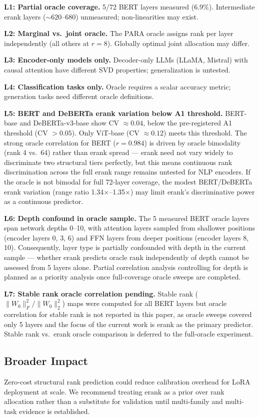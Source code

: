 \textbf{L1: Partial oracle coverage.} 5/72 BERT layers measured (6.9\%). Intermediate erank layers ($\sim 620$--$680$) unmeasured; non-linearities may exist.

\textbf{L2: Marginal vs.\ joint oracle.} The PARA oracle assigns rank per layer independently (all others at $r=8$). Globally optimal joint allocation may differ.

\textbf{L3: Encoder-only models only.} Decoder-only LLMs (LLaMA, Mistral) with causal attention have different SVD properties; generalization is untested.

\textbf{L4: Classification tasks only.} Oracle requires a scalar accuracy metric; generation tasks need different oracle definitions.

\textbf{L5: BERT and DeBERTa erank variation below A1 threshold.} BERT-base and DeBERTa-v3-base show CV $\approx 0.04$, below the pre-registered A1 threshold (CV $> 0.05$). Only ViT-base (CV $\approx 0.12$) meets this threshold. The strong oracle correlation for BERT ($r = 0.984$) is driven by oracle bimodality (rank 4 vs.\ 64) rather than erank spread --- erank need not vary widely to discriminate two structural tiers perfectly, but this means continuous rank discrimination across the full erank range remains untested for NLP encoders. If the oracle is not bimodal for full 72-layer coverage, the modest BERT/DeBERTa erank variation (range ratio 1.34$\times$--1.35$\times$) may limit erank's discriminative power as a continuous predictor.

\textbf{L6: Depth confound in oracle sample.} The 5 measured BERT oracle layers span network depths 0--10, with attention layers sampled from shallower positions (encoder layers 0, 3, 6) and FFN layers from deeper positions (encoder layers 8, 10). Consequently, layer type is partially confounded with depth in the current sample --- whether erank predicts oracle rank independently of depth cannot be assessed from 5 layers alone. Partial correlation analysis controlling for depth is planned as a priority analysis once full-coverage oracle sweeps are completed.

\textbf{L7: Stable rank oracle correlation pending.} Stable rank ($\|W_0\|_F^2 / \|W_0\|_2^2$) maps were computed for all BERT layers but oracle correlation for stable rank is not reported in this paper, as oracle sweeps covered only 5 layers and the focus of the current work is erank as the primary predictor. Stable rank vs.\ erank oracle comparison is deferred to the full-oracle experiment.

\subsection{Broader Impact}

Zero-cost structural rank prediction could reduce calibration overhead for LoRA deployment at scale. We recommend treating erank as a prior over rank allocation rather than a substitute for validation until multi-family and multi-task evidence is established.

